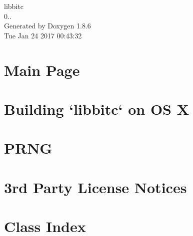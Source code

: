 \documentclass[twoside]{book}
\newcommand{\clearemptydoublepage}{%
  \newpage{\pagestyle{empty}\cleardoublepage}%
}
\begin{document}
\hypersetup{pageanchor=false}
\begin{titlepage}
\vspace*{7cm}
\begin{center}%
{\Large libbitc \\[1ex]\large 0.. }\\
\vspace*{1cm}
{\large Generated by Doxygen 1.8.6}\\
\vspace*{0.5cm}
{\small Tue Jan 24 2017 00:43:32}\\
\end{center}
\end{titlepage}
\clearemptydoublepage
\tableofcontents
\clearemptydoublepage
{}
\hypersetup{pageanchor=true}

\chapter{Main Page}
\label{index}\hypertarget{index}{}
\chapter{Building `libbitc` on O\-S X}
\label{md__home_ubuntu_workspace_doc_build-osx}
\hypertarget{md__home_ubuntu_workspace_doc_build-osx}{}

\chapter{P\-R\-N\-G}
\label{md__home_ubuntu_workspace_doc_PRNG}
\hypertarget{md__home_ubuntu_workspace_doc_PRNG}{}

\chapter{3rd Party License Notices}
\label{md__home_ubuntu_workspace_LICENSE-3RD-PARTY}
\hypertarget{md__home_ubuntu_workspace_LICENSE-3RD-PARTY}{}

\chapter{Class Index}

\end{document}
